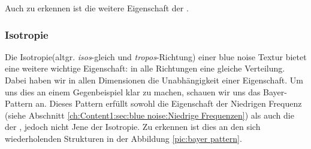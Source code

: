 Auch zu erkennen ist die weitere Eigenschaft der .

\subsubsection{Isotropie}
\label{ch:Content1:sec:blue noise:Isotropie}

Die Isotropie(altgr. \textit{isos}-gleich und \textit{tropos}-Richtung)
einer blue noise Textur bietet eine weitere wichtige Eigenschaft: in alle Richtungen eine gleiche  
Verteilung. Dabei haben wir in allen Dimensionen
die Unabhängigkeit einer Eigenschaft. Um uns dies an einem Gegenbeispiel 
klar zu machen, schauen wir uns das Bayer-Pattern an. Dieses Pattern erfüllt sowohl 
die Eigenschaft der Niedrigen Frequenz (siehe Abschnitt \ref{ch:Content1:sec:blue noise:Niedrige Frequenzen}) als auch 
die der , jedoch nicht Jene der Isotropie.
Zu erkennen ist dies an den sich wiederholenden Strukturen in der Abbildung \ref{pic:bayer pattern}.

